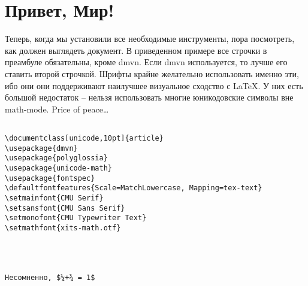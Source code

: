 \section{Привет, Мир!}

Теперь, когда мы установили все необходимые инструменты, пора
посмотреть, как должен выглядеть документ. В приведенном примере все
строчки в преамбуле обязательны, кроме {\ttfamily dmvn}. Если dmvn
используется, то лучше его ставить второй строчкой.  Шрифты крайне
желательно использовать именно эти, ибо они они поддерживают наилучшее
визуальное сходство с \LaTeX. У них есть большой недостаток -- нельзя
использовать многие юникодовские символы вне math-mode.  Price of
peace…
\begin{verbatim}

\documentclass[unicode,10pt]{article}
\usepackage{dmvn}
\usepackage{polyglossia}
\usepackage{unicode-math}
\usepackage{fontspec}
\defaultfontfeatures{Scale=MatchLowercase, Mapping=tex-text}
\setmainfont{CMU Serif}
\setsansfont{CMU Sans Serif}
\setmonofont{CMU Typewriter Text}
\setmathfont{xits-math.otf}




Несомненно, $¼+¾ = 1$

\end{verbatim}
